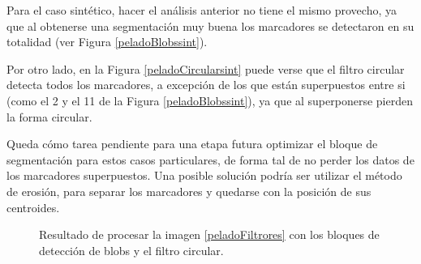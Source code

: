 Para el caso sintético, hacer el análisis anterior no tiene el mismo provecho, ya que al obtenerse una segmentación muy buena los marcadores se detectaron en su totalidad (ver Figura \ref{peladoBlobssint}). 

Por otro lado, en la Figura \ref{peladoCircularsint} puede verse que el filtro circular detecta todos los marcadores, a excepción de los que están superpuestos entre si (como el 2 y el 11 de la Figura \ref{peladoBlobssint}), ya que al superponerse pierden la forma circular.

 Queda cómo tarea pendiente para una etapa futura optimizar el bloque de segmentación para estos casos particulares, de forma tal de no perder los datos de los marcadores superpuestos. Una posible solución podría ser utilizar el método de erosión, para separar los marcadores y quedarse con la posición de sus centroides.

\begin{figure}[ht!]
        \hspace{-1cm}
         \hspace{1 mm}
  \caption{Resultado de procesar la imagen \ref{peladoFiltrores} con los bloques de detección de blobs y el filtro circular.}
      \label{detectMarcadoresSinteticos}
\end{figure}

